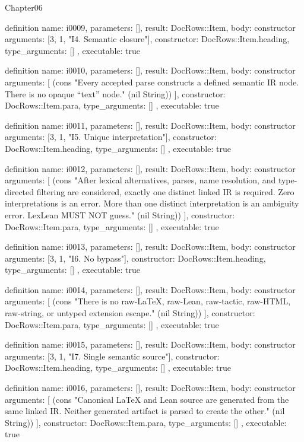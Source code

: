\begin{lexlean}{Chapter06}
\begin{semanticmodule}
definition{
  name: i0009,
  parameters: [],
  result: DocRows::Item,
  body: constructor{
    arguments: [3, 1, "I4. Semantic closure"],
    constructor: DocRows::Item.heading,
    type_arguments: []
  },
  executable: true
}

definition{
  name: i0010,
  parameters: [],
  result: DocRows::Item,
  body: constructor{
    arguments: [
      (cons "Every accepted parse constructs a defined semantic IR node. There is no opaque “text” node." (nil String))
    ],
    constructor: DocRows::Item.para,
    type_arguments: []
  },
  executable: true
}

definition{
  name: i0011,
  parameters: [],
  result: DocRows::Item,
  body: constructor{
    arguments: [3, 1, "I5. Unique interpretation"],
    constructor: DocRows::Item.heading,
    type_arguments: []
  },
  executable: true
}

definition{
  name: i0012,
  parameters: [],
  result: DocRows::Item,
  body: constructor{
    arguments: [
      (cons "After lexical alternatives, parses, name resolution, and type-directed filtering are considered, exactly one distinct linked IR is required. Zero interpretations is an error. More than one distinct interpretation is an ambiguity error. LexLean MUST NOT guess." (nil String))
    ],
    constructor: DocRows::Item.para,
    type_arguments: []
  },
  executable: true
}

definition{
  name: i0013,
  parameters: [],
  result: DocRows::Item,
  body: constructor{
    arguments: [3, 1, "I6. No bypass"],
    constructor: DocRows::Item.heading,
    type_arguments: []
  },
  executable: true
}

definition{
  name: i0014,
  parameters: [],
  result: DocRows::Item,
  body: constructor{
    arguments: [
      (cons "There is no raw-LaTeX, raw-Lean, raw-tactic, raw-HTML, raw-string, or untyped extension escape." (nil String))
    ],
    constructor: DocRows::Item.para,
    type_arguments: []
  },
  executable: true
}

definition{
  name: i0015,
  parameters: [],
  result: DocRows::Item,
  body: constructor{
    arguments: [3, 1, "I7. Single semantic source"],
    constructor: DocRows::Item.heading,
    type_arguments: []
  },
  executable: true
}

definition{
  name: i0016,
  parameters: [],
  result: DocRows::Item,
  body: constructor{
    arguments: [
      (cons "Canonical LaTeX and Lean source are generated from the same linked IR. Neither generated artifact is parsed to create the other." (nil String))
    ],
    constructor: DocRows::Item.para,
    type_arguments: []
  },
  executable: true
}


\end{semanticmodule}
\end{lexlean}
